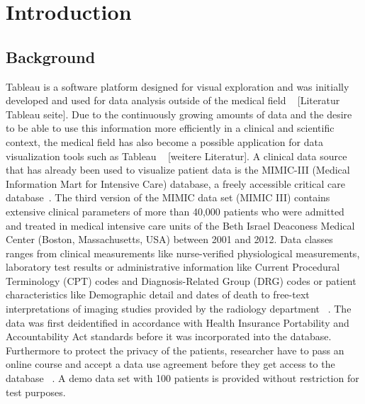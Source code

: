 \documentclass[aac,crcready]{iosart2x}
\begin{document}

\section{Introduction}\label{s1}

\subsection{Background}\label{s1.1}
\noindent Tableau is a software platform designed for visual exploration and was initially developed and used for data analysis outside of the medical field ~\cite{Ko.2017} [Literatur Tableau seite]. Due to the continuously growing amounts of data and the desire to be able to use this information more efficiently in a clinical and scientific context, the medical field has also become a possible application for data visualization tools such as Tableau ~\cite{Ko.2017} [weitere Literatur]. A clinical data source that has already been used to visualize patient data is the MIMIC-III (Medical Information Mart for Intensive Care) database, a freely accessible critical care database~\cite{Festag.2019,Lee.2016,Johnson.2020,Johnson.2016}. The third version of the MIMIC data set (MIMIC III) contains extensive clinical parameters of more than 40,000 patients who were admitted and treated in medical intensive care units of the Beth Israel Deaconess Medical Center (Boston, Massachusetts, USA) between 2001 and 2012. Data classes ranges from clinical measurements like nurse-verified physiological measurements, laboratory test results or administrative
information like Current Procedural Terminology (CPT) codes and Diagnosis-Related Group (DRG) codes or patient characteristics like Demographic detail and dates of death to free-text interpretations of imaging studies provided by the radiology department ~\cite{Johnson.2020,Johnson.2016}. The data was first deidentified in accordance with Health Insurance Portability and Accountability Act standards before it was incorporated into the database. Furthermore to protect the privacy of the patients, researcher have to pass an online course and accept a data use agreement before they get access to the database ~\cite{Johnson.2020,Johnson.2016}. A demo data set with 100 patients is provided without restriction for test purposes.
\end{document}
